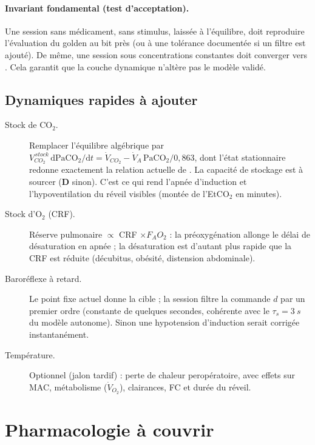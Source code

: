 \documentclass[10pt,a4paper]{article}
\newcommand{\vp}[1]{\text{\texttt{\detokenize{#1}}}}
\newcommand{\evD}{\textcolor{red!70!black}{\textbf{D}}}
\newcommand{\dd}{\mathrm{d}}
\begin{document}
\paragraph{Invariant fondamental (test d'acceptation).} Une session sans médicament, sans stimulus, laissée à l'équilibre,
doit reproduire l'évaluation \vp{eval} du golden au bit près (ou à une tolérance documentée si un filtre est ajouté).
De même, une session sous concentrations constantes doit converger vers \vp{eval --conc}. Cela garantit que la couche
dynamique n'altère pas le modèle validé.

\subsection{Dynamiques rapides à ajouter}
\begin{description}
\item[Stock de CO$_2$.] Remplacer l'équilibre algébrique par
$V_{CO_2}^{\,stock}\,\dd \mathrm{PaCO_2}/\dd t = \dot V_{CO_2} - \dot V_A\,\mathrm{PaCO_2}/0{,}863$,
dont l'état stationnaire redonne exactement la relation actuelle de \vp{gas.rs}. La capacité de stockage est à sourcer (\evD{} sinon).
C'est ce qui rend l'apnée d'induction et l'hypoventilation du réveil visibles (montée de l'EtCO$_2$ en minutes).
\item[Stock d'O$_2$ (CRF).] Réserve pulmonaire $\propto$ CRF $\times F_AO_2$ : la préoxygénation allonge le délai de désaturation
en apnée ; la désaturation est d'autant plus rapide que la CRF est réduite (décubitus, obésité, distension abdominale).
\item[Baroréflexe à retard.] Le point fixe actuel donne la cible ; la session filtre la commande $d$ par un premier ordre
(constante de quelques secondes, cohérente avec le $\tau_s = \SI{3}{s}$ du modèle autonome). Sinon une hypotension d'induction
serait corrigée instantanément.
\item[Température.] Optionnel (jalon tardif) : perte de chaleur peropératoire, avec effets sur MAC, métabolisme ($\dot V_{O_2}$),
clairances, FC et durée du réveil.
\end{description}

\section{Pharmacologie à couvrir}
\end{document}

